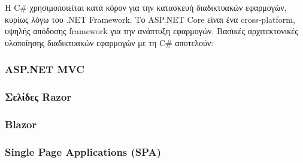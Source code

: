 Η C\# χρησιμοποιείται κατά κόρον για την κατασκευή διαδικτυακών εφαρμογών, κυρίως λόγω του .NET Framework.
Το ASP.NET Core είναι ένα cross-platform, υψηλής απόδοσης framework για την ανάπτυξη εφαρμογών.
Βασικές αρχιτεκτονικές υλοποίησης διαδικτυακών εφαρμογών με τη C\#  αποτελούν:

\subsubsection{ASP.NET MVC}


\subsubsection{Σελίδες Razor}


\subsubsection{Blazor}


\subsubsection{Single Page Applications (SPA)}
